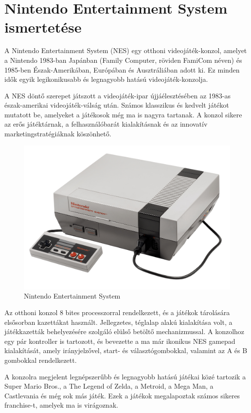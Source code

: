 \chapter{Nintendo Entertainment System ismertetése}

A Nintendo Entertainment System (NES) egy otthoni videojáték-konzol, amelyet a Nintendo 1983-ban Japánban (Family Computer, röviden FamiCom néven) és 1985-ben Észak-Amerikában, Európában és Ausztráliában adott ki. Ez minden idők egyik legikonikusabb és legnagyobb hatású videojáték-konzolja.

A NES döntő szerepet játszott a videojáték-ipar újjáélesztésében az 1983-as észak-amerikai videojáték-válság után. Számos klasszikus és kedvelt játékot mutatott be, amelyeket a játékosok még ma is nagyra tartanak. A konzol sikere az erős játéktárnak, a felhasználóbarát kialakításnak és az innovatív marketingstratégiáknak köszönhető.
\begin{figure}[H]
	\centering
	\includegraphics[width=120mm, keepaspectratio]{figures/NES-console-set}
	\caption{Nintendo Entertainment System}
	\label{fig:NES-Consol}
\end{figure}

Az otthoni konzol 8 bites processzorral rendelkezett, és a játékok tárolására elsősorban kazettákat használt. Jellegzetes, téglalap alakú kialakítása volt, a játékkazetták behelyezésére szolgáló elülső betöltő mechanizmussal. A konzolhoz egy pár kontroller is tartozott, és bevezette a ma már ikonikus NES gamepad kialakítását, amely irányjelzővel, start- és választógombokkal, valamint az A és B gombokkal rendelkezett.

A konzolra megjelent legnépszerűbb és legnagyobb hatású játékai közé tartozik a Super Mario Bros., a The Legend of Zelda, a Metroid, a Mega Man, a Castlevania és még sok más játék. Ezek a játékok megalapoztak számos sikeres franchise-t, amelyek ma is virágoznak.

